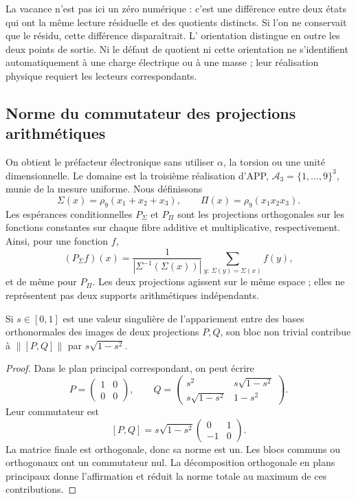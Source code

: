 La vacance n'est pas ici un zéro numérique : c'est une différence entre deux
états qui ont la même lecture résiduelle et des quotients distincts. Si l'on
ne conservait que le résidu, cette différence disparaîtrait. L'
orientation distingue en outre les deux points de sortie. Ni le défaut de
quotient ni cette orientation ne s'identifient automatiquement à une charge
électrique ou à une masse ; leur réalisation physique requiert les lecteurs
correspondants.

\subsection{Norme du commutateur des projections arithmétiques}

On obtient le préfacteur électronique sans utiliser \(\alpha\), la torsion ou une unité dimensionnelle. Le domaine est la troisième réalisation d'APP, \(\mathcal A_3=\{1,\ldots,9\}^3\), munie de la mesure uniforme. Nous définissons
\[
 \Sigma(x)=\rho_9(x_1+x_2+x_3),\qquad
 \Pi(x)=\rho_9(x_1x_2x_3).
\]
Les espérances conditionnelles \(P_\Sigma\) et \(P_\Pi\) sont les
projections orthogonales sur les fonctions constantes sur chaque fibre
additive et multiplicative, respectivement. Ainsi, pour une fonction \(f\),
\[
 (P_\Sigma f)(x)
 =\frac{1}{|\Sigma^{-1}(\Sigma(x))|}
   \sum_{y:\,\Sigma(y)=\Sigma(x)}f(y),
\]
et de même pour \(P_\Pi\). Les deux projections agissent sur le même espace ; elles ne représentent pas deux supports arithmétiques indépendants.

\begin{lemma}
Si \(s\in[0,1]\) est une valeur singulière de l'appariement entre des bases
orthonormales des images de deux projections \(P,Q\), son bloc non
trivial contribue à \(\|[P,Q]\|\) par
\(s\sqrt{1-s^2}\).
\end{lemma}
\begin{proof}
Dans le plan principal correspondant, on peut écrire
\[
 P=\begin{pmatrix}1&0\\0&0\end{pmatrix},\qquad
 Q=\begin{pmatrix}
 s^2&s\sqrt{1-s^2}\\
 s\sqrt{1-s^2}&1-s^2
 \end{pmatrix}.
\]
Leur commutateur est
\[
 [P,Q]=s\sqrt{1-s^2}
 \begin{pmatrix}0&1\\-1&0\end{pmatrix}.
\]
La matrice finale est orthogonale, donc sa norme est un. Les blocs communs ou orthogonaux ont un commutateur nul. La décomposition orthogonale en plans principaux donne l'affirmation et réduit la norme totale au maximum de ces contributions.
\end{proof}

